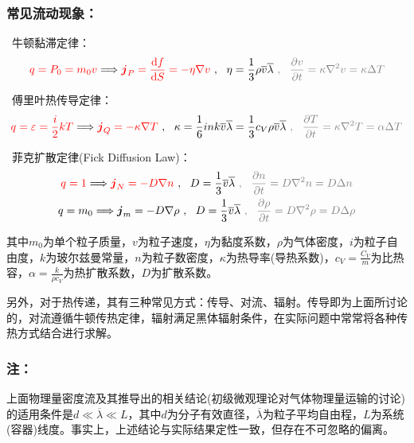 \documentclass[zihao=-4,UTF8]{report}
\begin{document}
\subsubsection{常见流动现象：}
\ 牛顿黏滞定律：
\begin{equation}
    {\color{red}q = P_0 = m_0v} \Longrightarrow \textcolor{red}{\boldsymbol{j}_P = \frac{\mathrm{d}f}{\mathrm{d}S} = - \eta \nabla v }\ ,\ \  \eta = \frac{1}{3}\rho \overline{v}\overline{\lambda} \textcolor{gray}{\ , \ \ \frac{\partial v}{\partial t} =\kappa \nabla^2 v =\kappa \Delta T}
\end{equation}\par
{}\ 傅里叶热传导定律：
\begin{equation}
    {\color{red}q = \varepsilon = \frac{i}{2}kT} \Longrightarrow \textcolor{red}{\boldsymbol{j}_Q = -\kappa \nabla T }\ ,\ \ \kappa = \frac{1}{6}ink\overline{v}\overline{\lambda} = \frac{1}{3}c_V\rho \overline{v} \overline{\lambda} \textcolor{gray}{\ , \ \ \frac{\partial T}{\partial t} =\kappa \nabla^2 T =\alpha \Delta T}
\end{equation}\par
{}\ 菲克扩散定律(Fick Diffusion Law)：
\begin{gather}
    {\color{red}q = 1} \Longrightarrow \textcolor{red}{\boldsymbol{j}_N = -D\nabla n}\ ,\ \ D = \frac{1}{3}\overline{v}\overline{\lambda} \textcolor{gray}{\ , \ \ \frac{\partial n}{\partial t} =D \nabla^2 n =D\Delta n}\\ 
    q = m_0 \Longrightarrow \boldsymbol{j}_m = -D\nabla \rho\ ,\ \ D = \frac{1}{3}\overline{v}\overline{\lambda}\textcolor{gray}{\ , \ \ \frac{\partial \rho}{\partial t} =D \nabla^2 \rho=D\Delta \rho}
\end{gather}\par
{\color{gray}\small 其中$m_0$为单个粒子质量，$v$为粒子速度，$\eta$为黏度系数，$\rho$为气体密度，$i$为粒子自由度，$k$为玻尔兹曼常量，$n$为粒子数密度，$\kappa$为热导率(导热系数)，$c_V = \frac{C_V}{m}$为比热容，$\alpha = \frac{k}{\rho c_V}$为热扩散系数，$D$为扩散系数。\par
另外，对于热传递，其有三种常见方式：传导、对流、辐射。传导即为上面所讨论的，对流遵循牛顿传热定律，辐射满足黑体辐射条件，在实际问题中常常将各种传热方式结合进行求解。}\par

\subsubsection{注：}上面物理量密度流及其推导出的相关结论(初级微观理论对气体物理量运输的讨论)的适用条件是$d \ll \overline{\lambda}\ll L$，其中$d$为分子有效直径，$\overline{\lambda}$为粒子平均自由程，$L$为系统(容器)线度。事实上，上述结论与实际结果定性一致，但存在不可忽略的偏离。
\end{document}
